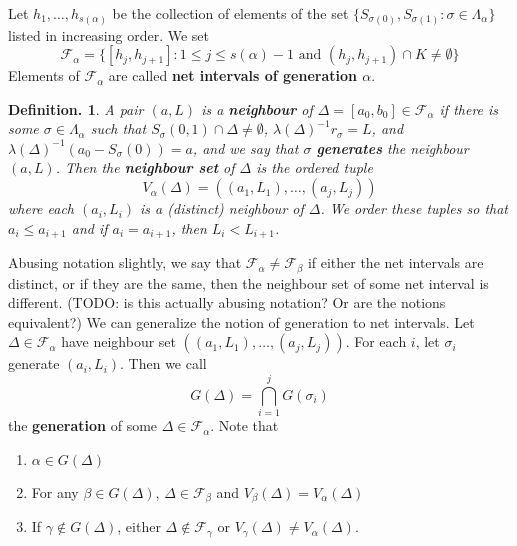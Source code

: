 \documentclass[11pt, a4paper]{memoir}
\newcommand{\mbf}[1]{{\boldmath\bfseries #1}}
\theoremstyle{change}
\theoremstyle{plain}
\theoremstyle{nonumberplain}
\newtheorem{definition}{Definition.}
\numberwithin{equation}{section}
\begin{document}
Let $h_1,\ldots,h_{s(\alpha)}$ be the collection of elements of the set $\{S_{\sigma(0)},S_{\sigma(1)}:\sigma\in\Lambda_\alpha\}$ listed in increasing order.
We set
\begin{equation*}
    \mathcal{F}_\alpha=\{[h_j,h_{j+1}]:1\leq j\leq s(\alpha)-1\text{ and }(h_j,h_{j+1})\cap K\neq\emptyset\}
\end{equation*}
Elements of $\mathcal{F}_\alpha$ are called \mbf{net intervals of generation $\alpha$}.
\begin{definition}
    A pair $(a,L)$ is a \textbf{neighbour} of $\Delta=[a_0,b_0]\in\mathcal{F}_\alpha$ if there is some $\sigma\in\Lambda_\alpha$ such that $S_\sigma(0,1)\cap\Delta\neq\emptyset$, $\lambda(\Delta)^{-1}r_\sigma=L$, and $\lambda(\Delta)^{-1}(a_0-S_\sigma(0))=a$, and we say that $\sigma$ \textbf{generates} the neighbour $(a,L)$.
    Then the \textbf{neighbour set} of $\Delta$ is the ordered tuple
    \begin{equation*}
        V_\alpha(\Delta)=((a_1,L_1),\ldots,(a_j,L_j))
    \end{equation*}
    where each $(a_i,L_i)$ is a (distinct) neighbour of $\Delta$.
    We order these tuples so that $a_i\leq a_{i+1}$ and if $a_i=a_{i+1}$, then $L_i<L_{i+1}$.
\end{definition}
Abusing notation slightly, we say that $\mathcal{F}_\alpha\neq\mathcal{F}_\beta$ if either the net intervals are distinct, or if they are the same, then the neighbour set of some net interval is different.
(TODO: is this actually abusing notation? Or are the notions equivalent?)
We can generalize the notion of generation to net intervals.
Let $\Delta\in\mathcal{F}_\alpha$ have neighbour set $((a_1,L_1),\ldots,(a_j,L_j))$.
For each $i$, let $\sigma_i$ generate $(a_i,L_i)$.
Then we call
\begin{equation*}
    G(\Delta)=\bigcap_{i=1}^j G(\sigma_i)
\end{equation*}
the \textbf{generation} of some $\Delta\in\mathcal{F}_\alpha$.
Note that
\begin{enumerate}[nl,r]
    \item $\alpha\in G(\Delta)$
    \item For any $\beta\in G(\Delta)$, $\Delta\in\mathcal{F}_\beta$ and $V_\beta(\Delta)=V_\alpha(\Delta)$
    \item If $\gamma\notin G(\Delta)$, either $\Delta\notin\mathcal{F}_\gamma$ or $V_\gamma(\Delta)\neq V_\alpha(\Delta)$.
\end{enumerate}
\end{document}

